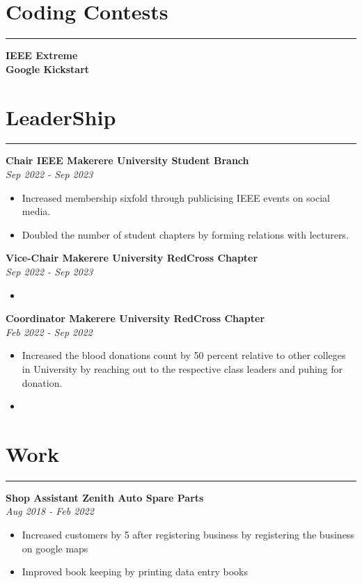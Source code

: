 \documentclass[a4paper]{article}
\begin{document}
\begin{minipage}[t]{0.5\textwidth}
        \section*{\bf Coding Contests}
        \hrule
        {\bf IEEE Extreme}\\
        {\bf Google Kickstart}\\

    \end{minipage}
    \hfil
    \begin{minipage}[t]{0.5\textwidth}
        \section*{\bf LeaderShip}
        \hrule
        {\bf Chair IEEE Makerere University Student Branch}\\
        \hfil{\em Sep 2022 - Sep 2023}
        \begin{itemize}
            \itemsep0em
            \item Increased membership sixfold through publicising IEEE events on social media.
            \item Doubled the number of student chapters by forming relations with lecturers.
        \end{itemize}


        {\bf Vice-Chair Makerere University RedCross Chapter}\\
        \hfil{\em Sep 2022 - Sep 2023}
        \begin{itemize}
            \itemsep0em
            \item
        \end{itemize}

        {\bf Coordinator Makerere University RedCross Chapter}\\
        \hfil{\em Feb 2022 - Sep 2022}
        \begin{itemize}
            \itemsep0em
            \item Increased the blood donations count by 50 percent relative to other colleges in University by reaching out to the respective class leaders and puhing for donation.
            \item
        \end{itemize}

        \section*{\bf Work}
        \hrule
        {\bf Shop Assistant Zenith Auto Spare Parts}\\
        \hfil{\em Aug 2018 - Feb 2022}
        \begin{itemize}
            \itemsep0em
            \item Increased customers by 5 after registering business by registering the business on google maps
            \item Improved book keeping by printing data entry books
        \end{itemize}


\end{minipage}
\end{document}

